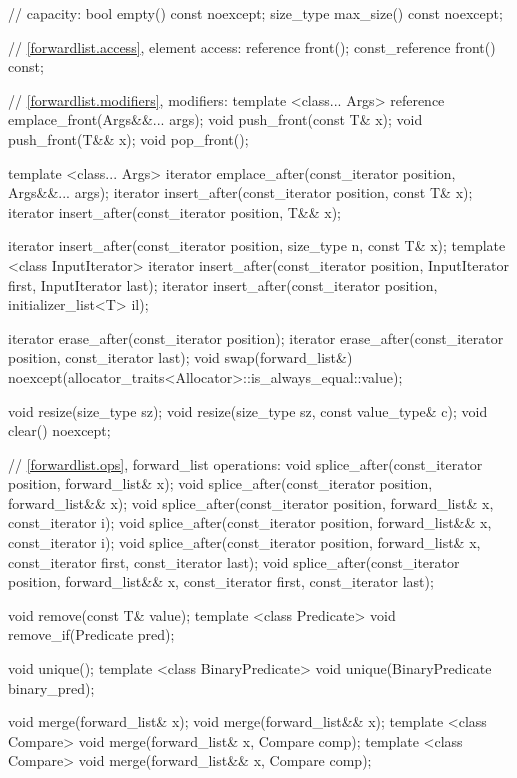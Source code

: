 \begin{codeblock}
{{    // capacity:
    bool      empty() const noexcept;
    size_type max_size() const noexcept;

    // \ref{forwardlist.access}, element access:
    reference front();
    const_reference front() const;

    // \ref{forwardlist.modifiers}, modifiers:
    template <class... Args> reference emplace_front(Args&&... args);
    void push_front(const T& x);
    void push_front(T&& x);
    void pop_front();

    template <class... Args> iterator emplace_after(const_iterator position, Args&&... args);
    iterator insert_after(const_iterator position, const T& x);
    iterator insert_after(const_iterator position, T&& x);

    iterator insert_after(const_iterator position, size_type n, const T& x);
    template <class InputIterator>
      iterator insert_after(const_iterator position, InputIterator first, InputIterator last);
    iterator insert_after(const_iterator position, initializer_list<T> il);

    iterator erase_after(const_iterator position);
    iterator erase_after(const_iterator position, const_iterator last);
    void swap(forward_list&)
      noexcept(allocator_traits<Allocator>::is_always_equal::value);

    void resize(size_type sz);
    void resize(size_type sz, const value_type& c);
    void clear() noexcept;

    // \ref{forwardlist.ops}, forward_list operations:
    void splice_after(const_iterator position, forward_list& x);
    void splice_after(const_iterator position, forward_list&& x);
    void splice_after(const_iterator position, forward_list& x,
                      const_iterator i);
    void splice_after(const_iterator position, forward_list&& x,
                      const_iterator i);
    void splice_after(const_iterator position, forward_list& x,
                      const_iterator first, const_iterator last);
    void splice_after(const_iterator position, forward_list&& x,
                      const_iterator first, const_iterator last);

    void remove(const T& value);
    template <class Predicate> void remove_if(Predicate pred);

    void unique();
    template <class BinaryPredicate> void unique(BinaryPredicate binary_pred);

    void merge(forward_list& x);
    void merge(forward_list&& x);
    template <class Compare> void merge(forward_list& x, Compare comp);
    template <class Compare> void merge(forward_list&& x, Compare comp);

}}
\end{codeblock}
